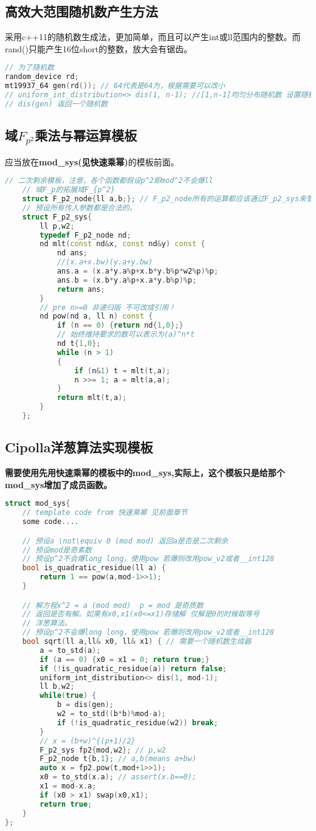 \subsection{高效大范围随机数产生方法}
\par 采用c++11的随机数生成法，更加简单，而且可以产生int或ll范围内的整数。而rand()只能产生16位short的整数，放大会有锯齿。
\begin{lstlisting}[language={c++}]
// 为了随机数
random_device rd;
mt19937_64 gen(rd()); // 64代表是64为，根据需要可以改小
// uniform_int_distribution<> dis(1, n-1); //[1,n-1]均匀分布随机数 设置随机数范围
// dis(gen) 返回一个随机数
\end{lstlisting}

\subsection{域$F_{p^2}$乘法与幂运算模板}
\par 应当放在\textbf{mod\_sys(见快速乘幂)}的模板前面。
\begin{lstlisting}[language={c++}]
	// 二次剩余模板，注意，各个函数都假设p^2即mod^2不会爆ll
	// 域F_p的拓展域F_{p^2}
	struct F_p2_node{ll a,b;}; // F_p2_node所有的运算都应该通过F_p2_sys来管理调用。
	// 预设所有传入参数都是合法的。
	struct F_p2_sys{
		ll p,w2;
		typedef F_p2_node nd;
		nd mlt(const nd&x, const nd&y) const {
			nd ans;
			//(x.a+x.bw)(y.a+y.bw)
			ans.a = (x.a*y.a%p+x.b*y.b%p*w2%p)%p;
			ans.b = (x.b*y.a%p+x.a*y.b%p)%p;
			return ans;
		}
		// pre n>=0 非递归版 不可改成引用！
		nd pow(nd a, ll n) const {
			if (n == 0) {return nd{1,0};}
			// 始终维持要求的数可以表示为(a)^n*t
			nd t{1,0};
			while (n > 1)
			{
				if (n&1) t = mlt(t,a);
				n >>= 1; a = mlt(a,a);
			}
			return mlt(t,a);
		}
	};
\end{lstlisting}
\subsection{Cipolla洋葱算法实现模板}
\textbf{需要使用先用快速乘幂的模板中的mod\_sys,实际上，这个模板只是给那个mod\_sys增加了成员函数。}
\begin{lstlisting}[language={c++}]
struct mod_sys{
	// template code from 快速乘幂 见前面章节
	some code....

	// 预设a \not\equiv 0 (mod mod) 返回a是否是二次剩余
	// 预设mod是奇素数
	// 预设p^2不会爆long long，使用pow 若爆则改用pow_v2或者__int128
	bool is_quadratic_residue(ll a) {
		return 1 == pow(a,mod-1>>1);
	}

	// 解方程x^2 = a (mod mod)  p = mod 是奇质数
	// 返回是否有解。如果有x0,x1(x0<=x1)存储解 仅解是0的时候取等号
	// 洋葱算法。
	// 预设p^2不会爆long long，使用pow 若爆则改用pow_v2或者__int128
	bool sqrt(ll a,ll& x0, ll& x1) { // 需要一个随机数生成器
		a = to_std(a);
		if (a == 0) {x0 = x1 = 0; return true;}
		if (!is_quadratic_residue(a)) return false;
		uniform_int_distribution<> dis(1, mod-1);
		ll b,w2;
		while(true) {
			b = dis(gen);
			w2 = to_std((b*b)%mod-a);
			if (!is_quadratic_residue(w2)) break;
		}
		// x = (b+w)^{(p+1)/2}
		F_p2_sys fp2{mod,w2}; // p,w2
		F_p2_node t{b,1}; // a,b(means a+bw)
		auto x = fp2.pow(t,mod+1>>1);
		x0 = to_std(x.a); // assert(x.b==0);
		x1 = mod-x.a;
		if (x0 > x1) swap(x0,x1);
		return true;
	}
};
\end{lstlisting}